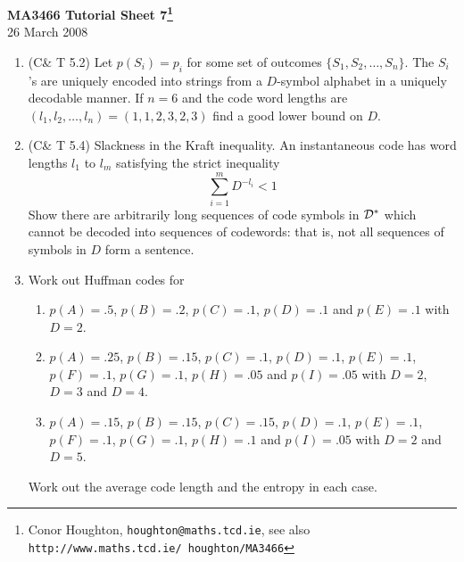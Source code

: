 \documentclass[12pt]{article}
\begin{document}
\begin{center}
{\bf MA3466 Tutorial Sheet 7\footnote{Conor Houghton, {\tt houghton@maths.tcd.ie}, see also {\tt http://www.maths.tcd.ie/ houghton/MA3466}}}\\[1cm]{} 26 March 2008
\end{center}
\begin{enumerate}

\item (C\& T 5.2) Let $p(S_i)=p_i$ for some set of outcomes $\{S_1,S_2,\ldots,S_n\}$. The $S_i$'s are uniquely encoded into strings from a $D$-symbol alphabet in a uniquely decodable manner. If $n=6$ and the code word lengths are $(l_1,l_2,\ldots,l_n)=(1,1,2,3,2,3)$ find a good lower bound on $D$.


\item (C\& T 5.4) Slackness in the Kraft inequality. An instantaneous code has word lengths $l_1$ to $l_m$ satisfying the strict inequality
\begin{equation}
\sum_{i=1}^m{D^{-l_i}}<1
\end{equation}
Show there are arbitrarily long sequences of code symbols in ${\cal D}^*$ which cannot be decoded into sequences of codewords: that is, not all sequences of symbols in $D$ form a sentence.


\item Work out Huffman codes for 
\begin{enumerate}
\item $p(A)=.5$, $p(B)=.2$, $p(C)=.1$, $p(D)=.1$ and $p(E)=.1$ with $D=2$.
\item $p(A)=.25$, $p(B)=.15$, $p(C)=.1$, $p(D)=.1$, $p(E)=.1$, $p(F)=.1$, $p(G)=.1$, $p(H)=.05$ and $p(I)=.05$ with $D=2$, $D=3$ and $D=4$.
\item $p(A)=.15$, $p(B)=.15$, $p(C)=.15$, $p(D)=.1$, $p(E)=.1$, $p(F)=.1$, $p(G)=.1$, $p(H)=.1$ and $p(I)=.05$ with $D=2$ and $D=5$.
\end{enumerate}
Work out the average code length and the entropy in each case.



\end{enumerate}
\end{document}
